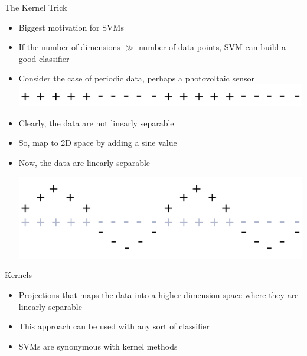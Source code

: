 \documentclass[aspectratio=169]{beamer}
\begin{document}
\begin{frame}{The Kernel Trick}

\begin{itemize}
\item Biggest motivation for SVMs
\item If the number of dimensions $\gg$ number of data points, SVM can build a good classifier
\item Consider the case of periodic data, perhaps a photovoltaic sensor\\
\vspace{1em}
\includegraphics[width=.4\textwidth]{lectSVM/sine1.pdf} \hspace{2em}
\vspace{1em}
\item Clearly, the data are not linearly separable
\item So, map to 2D space by adding a sine value
\item Now, the data are linearly separable

\includegraphics[width=.4\textwidth]{lectSVM/sine2.pdf}\hspace{2em}
\end{itemize}


\end{frame}
\begin{frame}{Kernels}

\begin{itemize}
\item Projections that maps the data into a higher dimension space where they are linearly separable
\item This approach can be used with any sort of classifier
\item SVMs are synonymous with kernel methods
\end{itemize}


\end{frame}
\end{document}
